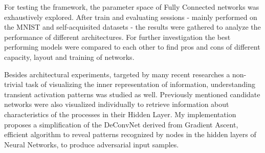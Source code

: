 \documentclass[a4paper, 11pt, oneside]{Thesis}  %
\begin{document}
{For testing the framework, the parameter space of Fully Connected networks was exhaustively explored. 
After train and evaluating sessions - mainly performed on the MNIST and self-acquisited datasets - the results were gathered to analyze the performance of different architectures. 
For further investigation the best performing models  were compared to each other to find pros and cons of different capacity, layout and training of networks.

Besides architectural experiments, targeted by many recent researches a non-trivial task of visualizing the inner representation of information, understanding transient activation patterns was studied as well.
Previously mentioned candidate networks were also visualized individually to retrieve information about characteristics of the processes in their Hidden Layer.
My implementation proposes a simplification of the DeConvNet derived from Gradient Ascent, efficient algorithm to reveal patterns recognized by nodes in the hidden layers of Neural Networks, to produce adversarial input samples.



}

\clearpage  %


\clearpage  %

\pagestyle{fancy}  %


\tableofcontents  %

\listoffigures  %
\end{document}
